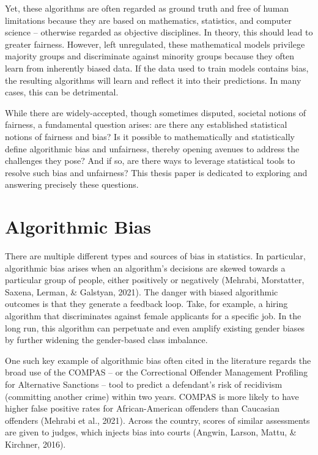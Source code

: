 \documentclass[12pt, twoside]{amherstthesis}
\begin{document}
Yet, these algorithms are often regarded as ground truth and free of human limitations because they are based on mathematics, statistics, and computer science -- otherwise regarded as objective disciplines. In theory, this should lead to greater fairness. However, left unregulated, these mathematical models privilege majority groups and discriminate against minority groups because they often learn from inherently biased data. If the data used to train models contains bias, the resulting algorithms will learn and reflect it into their predictions. In many cases, this can be detrimental.

While there are widely-accepted, though sometimes disputed, societal notions of fairness, a fundamental question arises: are there any established statistical notions of fairness and bias? Is it possible to mathematically and statistically define algorithmic bias and unfairness, thereby opening avenues to address the challenges they pose? And if so, are there ways to leverage statistical tools to resolve such bias and unfairness? This thesis paper is dedicated to exploring and answering precisely these questions.

\hypertarget{algbias}{%
\section{Algorithmic Bias}\label{algbias}}

There are multiple different types and sources of bias in statistics. In particular, algorithmic bias arises when an algorithm's decisions are skewed towards a particular group of people, either positively or negatively (Mehrabi, Morstatter, Saxena, Lerman, \& Galstyan, 2021). The danger with biased algorithmic outcomes is that they generate a feedback loop. Take, for example, a hiring algorithm that discriminates against female applicants for a specific job. In the long run, this algorithm can perpetuate and even amplify existing gender biases by further widening the gender-based class imbalance.

One such key example of algorithmic bias often cited in the literature regards the broad use of the COMPAS -- or the Correctional Offender Management Profiling for Alternative Sanctions -- tool to predict a defendant's risk of recidivism (committing another crime) within two years. COMPAS is more likely to have higher false positive rates for African-American offenders than Caucasian offenders (Mehrabi et al., 2021). Across the country, scores of similar assessments are given to judges, which injects bias into courts (Angwin, Larson, Mattu, \& Kirchner, 2016).
\end{document}
